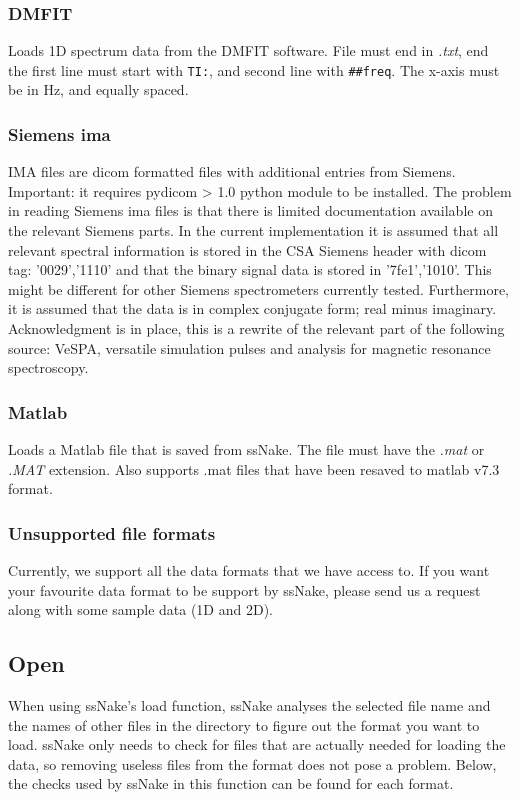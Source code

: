 \documentclass[11pt,a4paper]{article}
\begin{document}
\subsubsection*{DMFIT}
Loads 1D spectrum data from the DMFIT software. File must end in \textit{.txt}, end the first line must start with \texttt{TI:}, and second line with \texttt{\#\#freq}. The x-axis must be in Hz, and equally spaced.

\subsubsection*{Siemens ima}
IMA files are dicom formatted files with additional entries from Siemens. Important: it requires pydicom > 1.0 python module to be installed. The problem in reading Siemens ima files is that there is limited documentation available on the relevant Siemens parts. In the current implementation it is assumed that all relevant spectral information is stored in the CSA Siemens header with dicom tag: '0029','1110' and that the binary signal data is stored in '7fe1','1010'. This might be different for other Siemens spectrometers currently tested. Furthermore, it is assumed that the data is in complex conjugate form; real minus imaginary. Acknowledgment is in place, this is a rewrite of the relevant part of the following source: VeSPA, versatile simulation pulses and analysis for magnetic resonance spectroscopy.

\subsubsection*{Matlab}
Loads a Matlab file that is saved from ssNake. The file must have the \textit{.mat} or \textit{.MAT} extension. Also supports .mat files that have been resaved to matlab v7.3 format.

\subsubsection*{Unsupported file formats}
Currently, we support all the data formats that we have access to. If you want your favourite data format to be support by ssNake, please send us a request along with some sample data (1D and 2D).

\subsection{Open}
When using ssNake's load function, ssNake analyses the selected file name and the names of other files in the directory to figure out the format you want to load. ssNake only needs to check for files that are actually needed for loading the data, so removing useless files from the format does not pose a problem. Below, the checks used by ssNake in this function can be found for each format.
\end{document}
